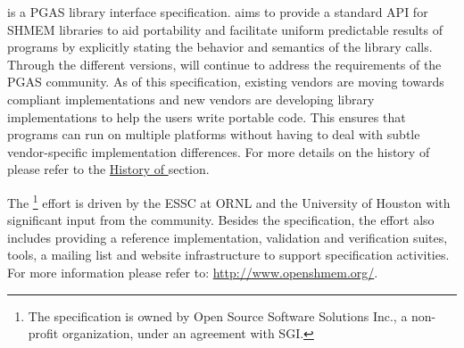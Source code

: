 \openshmem is a \ac{PGAS} library interface specification. \openshmem aims to
provide a standard \ac{API} for SHMEM libraries to aid portability and
facilitate uniform predictable results of \openshmem programs by explicitly
stating the behavior and semantics of the \openshmem library calls. Through the
different versions, \openshmem will continue to address the requirements of the
\ac{PGAS} community.  As of this specification, existing vendors are moving
towards \openshmem compliant implementations and new vendors are developing
\openshmem library implementations to help the users write portable \openshmem
code. This ensures that programs can run on multiple platforms without having to
deal with subtle vendor-specific implementation differences. For more details on
the history of \openshmem please refer to the
\hyperref[sec:openshmem_history]{History of \openshmem} section.  

The \openshmem\footnote{The \openshmem specification is owned by Open Source
Software Solutions Inc., a non-profit organization, under an agreement with
SGI.}  effort is driven by the \ac{ESSC} at \ac{ORNL} and the University of
Houston with significant input from the \openshmem community. Besides the
specification, the effort also includes providing a reference \openshmem
implementation, validation and verification suites, tools, a mailing list and
website infrastructure to support specification activities. For more information
please refer to: \url{http://www.openshmem.org/}.
